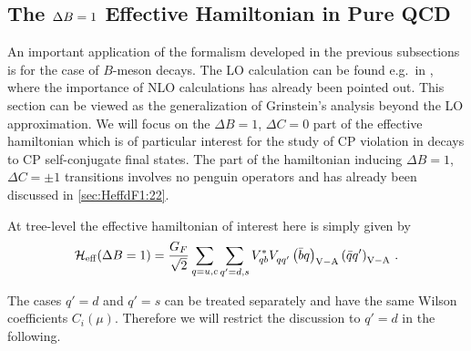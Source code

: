 \subsection{The $\Delta B=1$ Effective Hamiltonian in Pure QCD}
            \label{sec:HeffdF1:66:dB1}
An important application of the formalism developed in the previous
subsections is for the case of $B$-meson decays.  The LO calculation
can be found e.g.\ in \cite{ponce:81}, \cite{grinstein:89} where the
importance of NLO calculations has already been pointed out.  This
section can be viewed as the generalization of Grinstein's analysis
beyond the LO approximation. We will focus on the $\Delta B=1$, $\Delta
C = 0$ part of the effective hamiltonian which is of particular
interest for the study of CP violation in decays to CP self-conjugate
final states.  The part of the hamiltonian inducing $\Delta B=1$,
$\Delta C = \pm 1$ transitions involves no penguin operators and has
already been discussed in \ref{sec:HeffdF1:22}.

At tree-level the effective hamiltonian of interest here is simply given by
\begin{equation} 
{\cal H}_{\rm eff}(\Delta B=1) = \frac{G_F}{\sqrt{2}} \sum_{q=u,c} \sum_{q'=d,s}
              V^*_{qb} V^{}_{qq'}
             \left(\bar b q  \right)_{\rm V-A}
             \left(\bar q q' \right)_{\rm V-A} \, .
\label{eq:HeffdB1:tree}
\end{equation} 

The cases $q'=d$ and $q'=s$ can be treated separately and have the same
Wilson coefficients $C_i(\mu)$. Therefore we will restrict the
discussion to $q'=d$ in the following.

